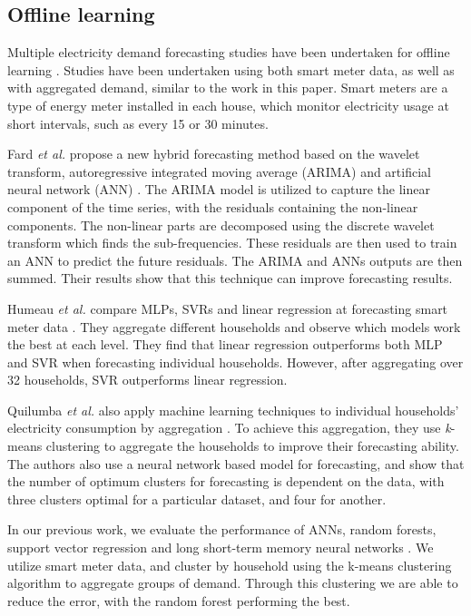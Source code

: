 \documentclass[final,3p,times,twocolumn,numbers]{elsarticle}
\begin{document}
\subsection{Offline learning}

Multiple electricity demand forecasting studies have been undertaken for offline learning \cite{Chen2004, Gross1987, Ghofrani}. Studies have been undertaken using both smart meter data, as well as with aggregated demand, similar to the work in this paper. Smart meters are a type of energy meter installed in each house, which monitor electricity usage at short intervals, such as every 15 or 30 minutes.


Fard \textit{et al.} propose a new hybrid forecasting method based on the wavelet transform, autoregressive integrated moving average (ARIMA) and artificial neural network (ANN) \cite{Fard2014}. The ARIMA model is utilized to capture the linear component of the time series, with the residuals containing the non-linear components. The non-linear parts are decomposed using the discrete wavelet transform which finds the sub-frequencies. These residuals are then used to train an ANN  to predict the future residuals. The ARIMA and ANNs outputs are then summed. Their results show that this technique can improve forecasting results.    

Humeau \textit{et al.} compare MLPs, SVRs and linear regression at forecasting smart meter data \cite{Humeau2013}. They aggregate different households and observe which models work the best at each level. They find that linear regression outperforms both MLP and SVR when forecasting individual households. However, after aggregating over 32 households, SVR outperforms linear regression.


Quilumba \textit{et al.} also apply machine learning techniques to individual households' electricity consumption by aggregation \cite{Fard2014}. To achieve this aggregation, they use \textit{k}-means clustering to aggregate the households to improve their forecasting ability. The authors also use a neural network based model for forecasting, and show that the number of optimum clusters for forecasting is dependent on the data, with three clusters optimal for a particular dataset, and four for another.

In our previous work, we evaluate the performance of ANNs, random forests, support vector regression and long short-term memory neural networks \cite{Kell2018a}. We utilize smart meter data, and cluster by household using the k-means clustering algorithm to aggregate groups of demand. Through this clustering we are able to reduce the error, with the random forest performing the best.
\end{document}
